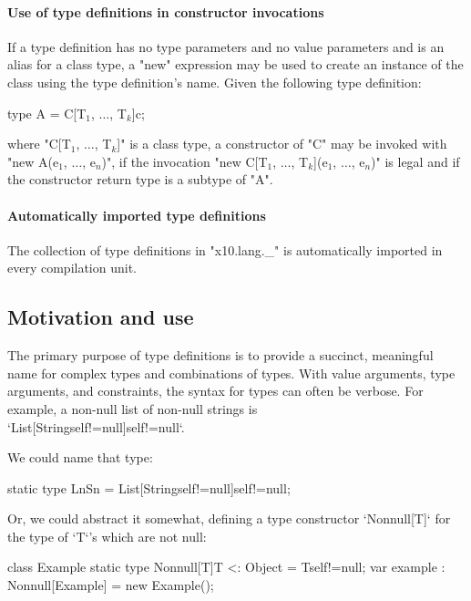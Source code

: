 \paragraph{Use of type definitions in constructor invocations}
If a type definition has no type parameters and no value
parameters and is an alias for a class type, a \xcd"new"
expression may be used to create an instance of the class using
the type definition's name.
Given the following type definition:
\begin{xtenmath}
type A = C[T$_1$, $\dots$, T$_k$]{c};
\end{xtenmath}
where 
\xcdmath"C[T$_1$, $\dots$, T$_k$]" is a
class type, a constructor of \xcdmath"C" may be invoked with
\xcdmath"new A(e$_1$, $\dots$, e$_n$)", if the
invocation
\xcdmath"new C[T$_1$, $\dots$, T$_k$](e$_1$, $\dots$, e$_n$)" is
legal and if the constructor return type is a subtype of
\xcd"A".

\paragraph{Automatically imported type definitions}
\label{X10LangUnderscore}

The collection of type definitions in
\xcdmath"x10.lang._" is automatically imported in every compilation unit.


\subsection{Motivation and use}
The primary purpose of type definitions is to provide a succinct,
meaningful name for complex types
and combinations of types. 
With value arguments, type arguments, and constraints, the syntax for \Xten{}
types can often be verbose. 
For example, a non-null list of non-null strings is \\
\xcd`List[String{self!=null}]{self!=null}`.

We could name that type: 
% 
\begin{xten}
static type LnSn = List[String{self!=null}]{self!=null};
\end{xten}
Or, we could abstract it somewhat, defining a type constructor
\xcd`Nonnull[T]` for the type of \xcd`T`'s which are not null:
% 
\begin{xten}
class Example {
  static type Nonnull[T]{T <: Object}  = T{self!=null};
  var example : Nonnull[Example] = new Example();
}
\end{xten}
%

